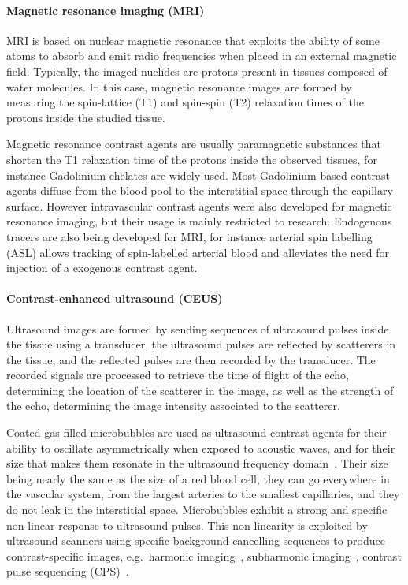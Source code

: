 \paragraph{Magnetic resonance imaging (MRI)}
\label{sec:IntroMR}
MRI is based on nuclear magnetic resonance that exploits the ability of some atoms to absorb and emit radio frequencies when placed in an external magnetic field.
Typically, the imaged nuclides are protons present in tissues composed of water molecules.
In this case, magnetic resonance images are formed by measuring the spin-lattice (T1) and spin-spin (T2) relaxation times of the protons inside the studied tissue.

Magnetic resonance contrast agents are usually paramagnetic substances that shorten the T1 relaxation time of the protons inside the observed tissues, for instance Gadolinium chelates are widely used.
Most Gadolinium-based contrast agents diffuse from the blood pool to the interstitial space through the capillary surface.
However intravascular contrast agents were also developed for magnetic resonance imaging, but their usage is mainly restricted to research.
Endogenous tracers are also being developed for MRI, for instance arterial spin labelling (ASL) allows tracking of spin-labelled arterial blood and alleviates the need for injection of a exogenous contrast agent.

\paragraph{Contrast-enhanced ultrasound (CEUS)}
\label{sec:IntroCEUS}
Ultrasound images are formed by sending sequences of ultrasound pulses inside the tissue using a transducer, the ultrasound pulses are reflected by scatterers in the tissue, and the reflected pulses are then recorded by the transducer.
The recorded signals are processed to retrieve the time of flight of the echo, determining the location of the scatterer in the image, as well as the strength of the echo, determining the image intensity associated to the scatterer.

Coated gas-filled microbubbles are used as ultrasound contrast agents for their ability to oscillate asymmetrically when exposed to acoustic waves, and for their size that makes them resonate in the ultrasound frequency domain~\cite{Greis:2004ub}.
Their size being nearly the same as the size of a red blood cell, they can go everywhere in the vascular system, from the largest arteries to the smallest capillaries, and they do not leak in the interstitial space.
Microbubbles exhibit a strong and specific non-linear response to ultrasound pulses.
This non-linearity is exploited by ultrasound scanners using specific background-cancelling sequences to produce contrast-specific images, e.g.~harmonic imaging~\cite{Meairs:2000eq}, subharmonic imaging~\cite{Eisenbrey:2015gk}, contrast pulse sequencing (CPS)~\cite{Phillips:2004ke}.

